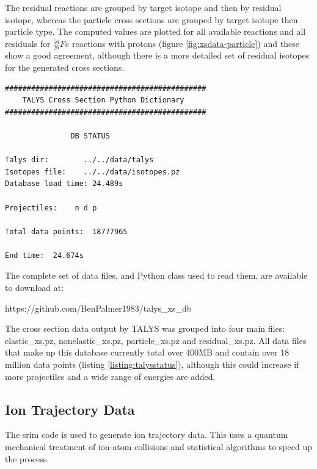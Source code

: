 The residual reactions are grouped by target isotope and then by residual isotope, whereas the particle cross sections are grouped by target isotope then particle type.  The computed values are plotted for all available reactions and all residuals for ${}^{56}_{26}Fe$ reactions with protons (figure \ref{fig:xsdata-particle}) and these show a good agreement, although there is a more detailed set of residual isotopes for the generated cross sections.

\begin{lstlisting}[style=sOutputFile,caption={Status report from TALYS database code},label={listing:talysstatus}]
##############################################
    TALYS Cross Section Python Dictionary     
##############################################

               DB STATUS                      

Talys dir:        ../../data/talys
Isotopes file:    ../../data/isotopes.pz
Database load time: 24.489s

Projectiles:    n d p 

Total data points:  18777965

End time:  24.674s
\end{lstlisting}

The complete set of data files, and Python class used to read them, are available to download at:

https://github.com/BenPalmer1983/talys\_xs\_db 

The cross section data output by TALYS was grouped into four main files: elastic\_xs.pz, nonelastic\_xs.pz, particle\_xs.pz and residual\_xs.pz.  All data files that make up this database currently total over 400MB and contain over 18 million data points (listing \ref{listing:talysstatus}), although this could increase if more projectiles and a wide range of energies are added.





\FloatBarrier
\subsection{Ion Trajectory Data}

The \acrshort{srim} code is used to generate ion trajectory data.  This uses a quantum mechanical treatment of ion-atom collisions and statistical algorithms to speed up the process\cite{srimwebsite}.

